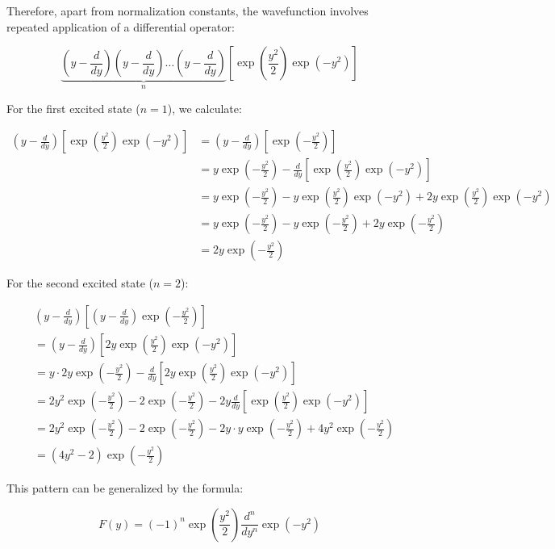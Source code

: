 \documentclass[italian]{HKNdocument}
\begin{document}
Therefore, apart from normalization constants, the wavefunction involves repeated application of a differential operator:

\begin{equation}
\underbrace{\left(y - \frac{d}{dy}\right)\left(y - \frac{d}{dy}\right)\ldots\left(y - \frac{d}{dy}\right)}_{n}\left[\exp\left(\frac{y^2}{2}\right)\exp(-y^2)\right]
\end{equation}

For the first excited state ($n=1$), we calculate:

\begin{align}
\left(y-\frac{d}{dy}\right)\left[\exp\left(\frac{y^2}{2}\right)\exp(-y^2)\right] &= \left(y-\frac{d}{dy}\right)\left[\exp\left(-\frac{y^2}{2}\right)\right] \\
&= y\exp\left(-\frac{y^2}{2}\right) - \frac{d}{dy}\left[\exp\left(\frac{y^2}{2}\right)\exp(-y^2)\right] \\
&= y\exp\left(-\frac{y^2}{2}\right) - y\exp\left(\frac{y^2}{2}\right)\exp(-y^2) + 2y\exp\left(\frac{y^2}{2}\right)\exp(-y^2) \\
&= y\exp\left(-\frac{y^2}{2}\right) - y\exp\left(-\frac{y^2}{2}\right) + 2y\exp\left(-\frac{y^2}{2}\right) \\
&= 2y\exp\left(-\frac{y^2}{2}\right)
\end{align}

For the second excited state ($n=2$):

\begin{align}
&\left(y-\frac{d}{dy}\right)\left[\left(y-\frac{d}{dy}\right)\exp\left(-\frac{y^2}{2}\right)\right] \\
&= \left(y-\frac{d}{dy}\right)\left[2y\exp\left(\frac{y^2}{2}\right)\exp(-y^2)\right] \\
&= y\cdot 2y\exp\left(-\frac{y^2}{2}\right) - \frac{d}{dy}\left[2y\exp\left(\frac{y^2}{2}\right)\exp(-y^2)\right]  \\
&= 2y^2\exp\left(-\frac{y^2}{2}\right) - 2\exp\left(-\frac{y^2}{2}\right) - 2y\frac{d}{dy}\left[\exp\left(\frac{y^2}{2}\right)\exp(-y^2)\right] \\
&= 2y^2\exp\left(-\frac{y^2}{2}\right) - 2\exp\left(-\frac{y^2}{2}\right) - 2y\cdot y\exp\left(-\frac{y^2}{2}\right) + 4y^2\exp\left(-\frac{y^2}{2}\right) \\
&= (4y^2-2)\exp\left(-\frac{y^2}{2}\right)
\end{align}

This pattern can be generalized by the formula:

\begin{equation}
F(y) = (-1)^n\exp\left(\frac{y^2}{2}\right)\frac{d^n}{dy^n}\exp(-y^2)
\end{equation}
\end{document}
